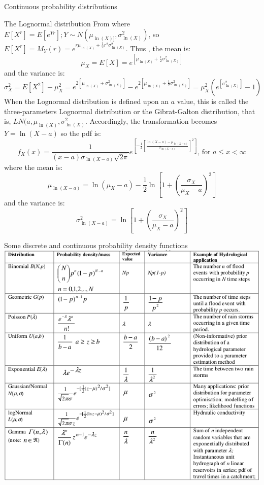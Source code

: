 \documentclass[8pt]{beamer}
\renewcommand{\emph}[1]{\textcolor{myorange}{#1}}
\begin{document}
\begin{frame}{Continuous probability distributions} 
    \begin{block}{The \alert{Lognormal} distribution}
        From where $E \left[X^r \right] = E\left[ e^{Yr} \right]; Y \sim N\left( \mu_{\ln(X)]}, \sigma_{\ln(X)}^2 \right)$, so $E \left[X^r \right] = M_Y (r) = e^{r\mu_{\ln(X)} + \frac{1}{2} r^2 \sigma_{\ln(X)}^2}$. Thus , the \emph{mean} is:
        \[
        \mu_X = E[X] = e^{\left[ \mu_{\ln(X)} + \frac{1}{2} \sigma_{\ln(X)}^2 \right]} 
    \]
     and the \emph{variance} is:
    \vspace{-9pt}
        \[
            \sigma_X^2 = E[X^2] - \mu_X^2 = e^{2\left[ \mu_{\ln(X)} + \sigma_{\ln(X)}^2 \right]} - e^{2\left[ \mu_{\ln(X)} + \frac{1}{2} \sigma_{\ln(X)}^2 \right]} = \mu_X^2 \left( e^{\left[ \sigma_{\ln(X)}^2\right]}  - 1 \right)
    \]
    When the \emph{Lognormal distribution} is defined upon an $a$ value, this is called the three-parameters Lognormal distribution or the \alert{Gibrat-Galton distribution}, that is, $LN (a, \mu_{\ln(X)}, \sigma_{\ln(X)}^2$. Accordingly, the transformation becomes $Y = \ln(X-a)$ so the \emph{pdf} is:
    \vspace{-9pt}
    \[
            f_X (x) = \frac{1}{(x-a) \sigma_{\ln (X-a)} \sqrt{2\pi}} e^{\left[ -\frac{1}{2} \left[ \frac{\ln (X-a) -\mu_{\ln (X-a)}}{\sigma_{\ln (X-a)}} \right]^2 \right]}, \, \text{for } a \leq x < \infty
        \]
        where the \emph{mean} is:
    \vspace{-9pt}
        \[
            \mu_{\ln(X-a)} = \ln \left(\mu_X -a \right) - \frac{1}{2} \ln \left[ 1 + \left( \frac{\sigma_X}{\mu_X -a} \right)^2 \right]
        \]
        and the \emph{variance} is:
    \vspace{-9pt}
        \[
        \sigma_{\ln(X-a)}^2 = \ln \left[ 1 + \left( \frac{\sigma_X}{\mu_X -a} \right)^2 \right]
    \]
   \end{block}
\end{frame}

\begin{frame}{Some discrete and continuous probability density functions} 
    \centering
\includegraphics[width=0.91\linewidth]{taBi32a.png}  %
\end{frame}
\end{document}
